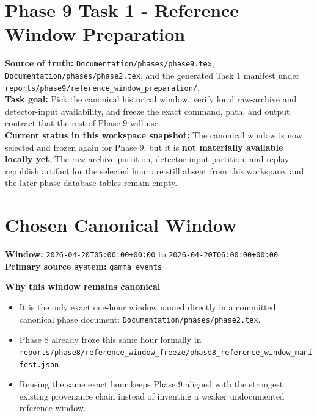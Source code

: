 \documentclass{article}
\begin{document}
\section*{Phase 9 Task 1 - Reference Window Preparation}

\textbf{Source of truth:} \texttt{Documentation/phases/phase9.tex}, \texttt{Documentation/phases/phase2.tex}, and the generated Task 1 manifest under \texttt{reports/phase9/reference\_window\_preparation/}.\\
\textbf{Task goal:} Pick the canonical historical window, verify local raw-archive and detector-input availability, and freeze the exact command, path, and output contract that the rest of Phase 9 will use.\\
\textbf{Current status in this workspace snapshot:} The canonical window is now selected and frozen again for Phase 9, but it is \textbf{not materially available locally yet}. The raw archive partition, detector-input partition, and replay-republish artifact for the selected hour are still absent from this workspace, and the later-phase database tables remain empty.

\section*{Chosen Canonical Window}
\textbf{Window:} \texttt{2026-04-20T05:00:00+00:00} to \texttt{2026-04-20T06:00:00+00:00}\\
\textbf{Primary source system:} \texttt{gamma\_events}

\textbf{Why this window remains canonical}
\begin{itemize}
\item It is the only exact one-hour window named directly in a committed canonical phase document: \texttt{Documentation/phases/phase2.tex}.
\item Phase 8 already froze this same hour formally in \texttt{reports/phase8/reference\_window\_freeze/phase8\_reference\_window\_manifest.json}.
\item Reusing the same exact hour keeps Phase 9 aligned with the strongest existing provenance chain instead of inventing a weaker undocumented reference window.
\end{itemize}
\end{document}
